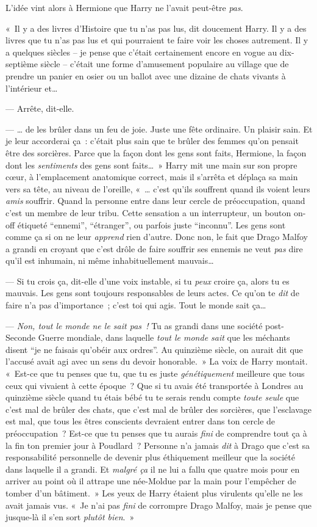 L'idée vint alors à Hermione que Harry ne l'avait peut-être \emph{pas}.

«~Il y a des livres d'Histoire que tu n'as pas lus, dit doucement Harry.
Il y a des livres que tu n'as pas lus et qui pourraient te faire voir les choses autrement.
Il y a quelques siècles -- je pense que c'était certainement encore en vogue au dix-septième siècle -- c'était une forme d'amusement populaire au village que de prendre un panier en osier ou un ballot avec une dizaine de chats vivants à l'intérieur et…

--- Arrête, dit-elle.

--- … de les brûler dans un feu de joie.
Juste une fête ordinaire.
Un plaisir sain.
Et je leur accorderai ça~: c'était plus sain que te brûler des femmes qu'on pensait être des sorcières.
Parce que la façon dont les gens sont faits, Hermione, la façon dont les \emph{sentiments} des gens sont faits…~»
Harry mit une main sur son propre cœur, à l'emplacement anatomique correct, mais il s'arrêta et déplaça sa main vers sa tête, au niveau de l'oreille, «~… c'est qu'ils souffrent quand ils voient leurs \emph{amis} souffrir.
Quand la personne entre dans leur cercle de préoccupation, quand c'est un membre de leur tribu.
Cette sensation a un interrupteur, un bouton on-off étiqueté “ennemi”, “étranger”, ou parfois juste “inconnu”.
Les gens sont comme ça si on ne leur \emph{apprend} rien d'autre.
Donc non, le fait que Drago Malfoy a grandi en croyant que c'est drôle de faire souffrir ses ennemis ne veut \emph{pas} dire qu'il est inhumain, ni même inhabituellement mauvais…

--- Si tu crois ça, dit-elle d'une voix instable, si tu \emph{peux} croire ça, alors tu es mauvais.
Les gens sont toujours responsables de leurs actes.
Ce qu'on te \emph{dit} de faire n'a pas d'importance~; c'est toi qui agis.
Tout le monde sait ça…

--- \emph{Non, tout le monde ne le sait pas~!} Tu as grandi dans une société post-Seconde Guerre mondiale, dans laquelle \emph{tout le monde sait} que les méchants disent “je ne faisais qu'obéir aux ordres”.
Au quinzième siècle, on aurait dit que l'accusé avait agi avec un sens du devoir honorable.~»
La voix de Harry montait.
«~Est-ce que tu penses que tu, que tu es juste \emph{génétiquement} meilleure que tous ceux qui vivaient à cette époque~?
Que si tu avais été transportée à Londres au quinzième siècle quand tu étais bébé tu te serais rendu compte \emph{toute seule} que c'est mal de brûler des chats, que c'est mal de brûler des sorcières, que l'esclavage est mal, que tous les êtres conscients devraient entrer dans ton cercle de préoccupation~?
Est-ce que tu penses que tu aurais \emph{fini} de comprendre tout ça à la fin ton premier jour à Poudlard~?
Personne n'a jamais \emph{dit} à Drago que c'est sa responsabilité personnelle de devenir plus éthiquement meilleur que la société dans laquelle il a grandi.
Et \emph{malgré ça} il ne lui a fallu que quatre mois pour en arriver au point où il attrape une née-Moldue par la main pour l'empêcher de tomber d'un bâtiment.~»
Les yeux de Harry étaient plus virulents qu'elle ne les avait jamais vus.
«~Je n'ai pas \emph{fini} de corrompre Drago Malfoy, mais je pense que jusque-là il s'en sort \emph{plutôt bien}.~»

